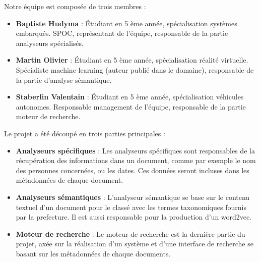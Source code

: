 Notre équipe est composée de trois membres :
\begin {itemize}
\item \textbf {Baptiste Hudyma} :
Étudiant en 5 ème année, spécialisation systèmes embarqués.
SPOC, représentant de l'équipe, responsable de la partie analyseurs spécialisés. 
\\
\item \textbf {Martin Olivier} : 
Étudiant en 5 ème année, spécialisation réalité virtuelle.
Spécialiste machine learning (auteur publié dans le domaine), responsable de la partie d'analyse sémantique.
\\
\item \textbf {Staberlin Valentain} :
Étudiant en 5 ème année, spécialisation véhicules autonomes.
Responsable management de l'équipe, responsable de la partie moteur de recherche.
\\
\end {itemize}


Le projet a été découpé en trois parties principales :
\begin {itemize}
\item \textbf {Analyseurs spécifiques} : 
Les analyseurs spécifiques sont responsables de la récupération des informations dans un document, comme par exemple le nom des personnes concernées, ou les dates.
Ces données seront incluses dans les métadonnées de chaque document.
\\
\item \textbf {Analyseurs sémantiques} :
L'analyseur sémantique se base sur le contenu textuel d'un document pour le classé avec les termes taxonomiques fournis par la prefecture.
Il est aussi responsable pour la production d'un word2vec.
\\
\item \textbf {Moteur de recherche} :
Le moteur de recherche est la dernière partie du projet, axée sur la réalisation d'un système et d'une interface de recherche se basant sur les métadonnées de chaque documents.
\\
\end {itemize}
